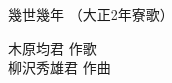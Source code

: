 \documentclass[10pt,b5j]{tarticle} %
\begin{document}
\begin{minipage}[c]{0.7\hsize} %
    \begin{center}
        {\LARGE
            幾世幾年 %
        }
        {\small 
            （大正2年寮歌） %
        }
    \end{center}
\end{minipage}
\begin{minipage}[c]{0.3\hsize} %
    \begin{flushright} %
        木原均君 作歌\\柳沢秀雄君 作曲 %
    \end{flushright}
\end{minipage}
\end{document}
